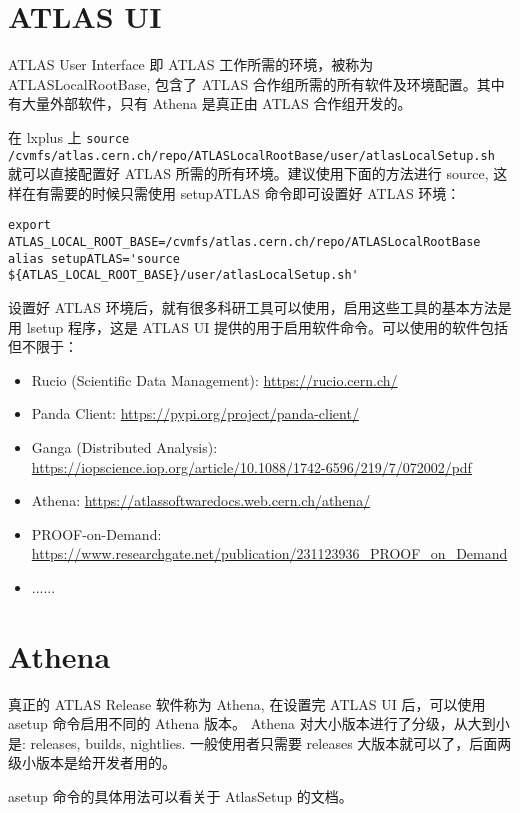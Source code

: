 \section{ATLAS UI}
ATLAS User Interface 即 ATLAS 工作所需的环境，被称为 ATLASLocalRootBase, 包含了 ATLAS 合作组所需的所有软件及环境配置。其中有大量外部软件，只有 Athena 是真正由 ATLAS 合作组开发的。

在 lxplus 上 \verb|source /cvmfs/atlas.cern.ch/repo/ATLASLocalRootBase/user/atlasLocalSetup.sh| 就可以直接配置好 ATLAS 所需的所有环境。建议使用下面的方法进行 source, 这样在有需要的时候只需使用 setupATLAS 命令即可设置好 ATLAS 环境：

\begin{verbatim}
export ATLAS_LOCAL_ROOT_BASE=/cvmfs/atlas.cern.ch/repo/ATLASLocalRootBase
alias setupATLAS='source ${ATLAS_LOCAL_ROOT_BASE}/user/atlasLocalSetup.sh'
\end{verbatim}

设置好 ATLAS 环境后，就有很多科研工具可以使用，启用这些工具的基本方法是用 lsetup 程序，这是 ATLAS UI 提供的用于启用软件命令。可以使用的软件包括但不限于：

\begin{itemize}
	\item Rucio (Scientific Data Management): \url{https://rucio.cern.ch/}
	\item Panda Client: \url{https://pypi.org/project/panda-client/}
	\item Ganga (Distributed Analysis): \url{https://iopscience.iop.org/article/10.1088/1742-6596/219/7/072002/pdf}
	\item Athena: \url{https://atlassoftwaredocs.web.cern.ch/athena/}
	\item PROOF-on-Demand: \url{https://www.researchgate.net/publication/231123936_PROOF_on_Demand}
	\item ......
\end{itemize}

\section{Athena}
真正的 ATLAS Release 软件称为 Athena, 在设置完 ATLAS UI 后，可以使用 asetup 命令启用不同的 Athena 版本。 Athena 对大小版本进行了分级，从大到小是: releases, builds, nightlies. 一般使用者只需要 releases 大版本就可以了，后面两级小版本是给开发者用的。

asetup 命令的具体用法可以看关于 AtlasSetup 的文档。



